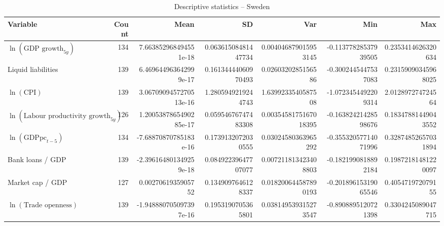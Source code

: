 \begin{table}[!htbp]
\centering
\caption{Descriptive statistics -- Sweden}
\footnotesize
\begin{tabular}{lrrrrrr}
\toprule
Variable & Count & Mean & SD & Var & Min & Max \\
\midrule
$\ln(\text{GDP growth}_{5y})$ & 134 & 7.663852968494551e-18 & 0.06361508481447734 & 0.004046879015953145 & -0.11377828537939505 & 0.2353414626320634 \\
Liquid liabilities & 139 & 6.469644963642999e-17 & 0.16134444060970493 & 0.0260320285156586 & -0.3002445447537083 & 0.23159090345968025 \\
$\ln(\text{CPI})$ & 139 & 3.0670909457270513e-16 & 1.2805949219244743 & 1.6399233540587508 & -1.0723454492209314 & 2.012897274724564 \\
$\ln(\text{Labour productivity growth}_{5y})$ & 126 & 1.2005387865490285e-17 & 0.05954676747483308 & 0.0035458175167018395 & -0.16382421428598676 & 0.18347881449043552 \\
$\ln(\text{GDPpc}_{t-5})$ & 134 & -7.68870870785183e-16 & 0.1739132072030555 & 0.03024580363965292 & -0.35532057714071996 & 0.32874852657031894 \\
Bank loans / GDP & 139 & -2.396164801349259e-18 & 0.08492239647707077 & 0.007211813423408803 & -0.1821990818892184 & 0.19872181481220097 \\
Market cap / GDP & 127 & 0.0027061935905752 & 0.1349097646128337 & 0.018200644587890193 & -0.20189615319065546 & 0.405471972079155 \\
$\ln(\text{Trade openness})$ & 139 & -1.948880705097397e-16 & 0.1953190705365801 & 0.038149539315273547 & -0.8908895120721398 & 0.3304245089047715 \\
\bottomrule
\end{tabular}
\end{table}


